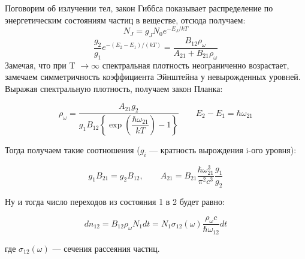 Поговорим об излучении тел, закон Гиббса показывает распределение по энергетическим состояниям частиц в веществе, отсюда получаем:
\begin{equation*}
N_{J}=g_{J} N_{0} e^{-E_{J} / k T}
\end{equation*}
\begin{equation*}
\frac{g_{2}}{g_{1}} e^{-\left(E_{2}-E_{1}\right) /(k T)}=\frac{B_{12} \rho_{\omega}}{A_{21}+B_{21} \rho_{\omega}}
\end{equation*}
Замечая, что при T $\rightarrow \infty$ спектральная плотность неограниченно возрастает, замечаем симметричность коэффициента Эйнштейна у невырожденных уровней. Выражая спектральную плотность, получаем закон Планка:

\begin{equation*}
\rho_{\omega}=\frac{A_{21} g_{2}}{g_{1} B_{12}\left\{\exp \left(\dfrac{\hbar \omega_{21}}{k T}\right)-1\right\}} \qquad E_{2}-E_{1}=\hbar \omega_{21}
\end{equation*}

Тогда получаем такие соотношения ($g_i$ --- кратность вырождения i-ого уровня): 

\begin{equation*}
g_1B_{21}=g_2B_{12}, \qquad
A_{21}=B_{21} \frac{\hbar \omega_{21}^{3}}{\pi^{2} c^{3}} \frac{g_{1}}{g_{2}}
\end{equation*}

Ну и тогда число переходов из состояния 1 в 2 будет равно:

\begin{equation*}
d n_{12}=B_{12} \rho_{\omega} N_{1} d t=N_{1} \sigma_{12}(\omega) \frac{\rho_{\omega} c}{\hbar \omega_{12}} d t
\end{equation*}

где $\sigma_{12}(\omega)$ --- сечения рассеяния частиц.